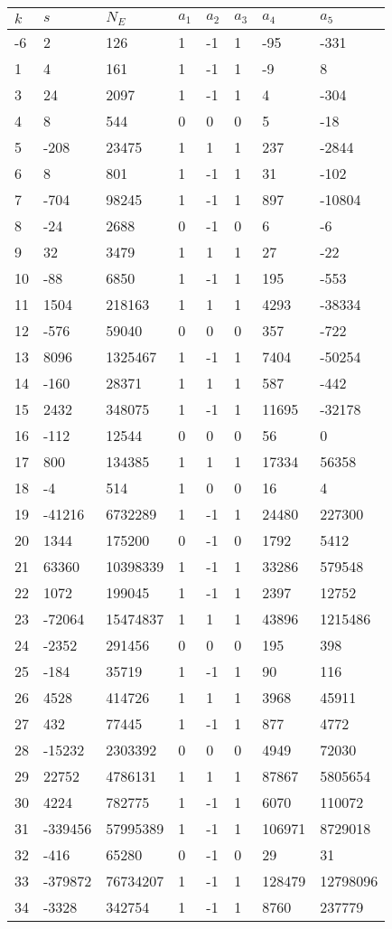 \documentclass{amsart}
\begin{document}
\begin{longtable}{|l|l|l|lllll|}
\hline
$k$ & $s$ & $N_E$ & $a_1$ & $a_2$ & $a_3$ & $a_4$ & $a_5$\\
\hline
-6&2&126&1&-1&1&-95&-331\\
1&4&161&1&-1&1&-9&8\\
3&24&2097&1&-1&1&4&-304\\
4&8&544&0&0&0&5&-18\\
5&-208&23475&1&1&1&237&-2844\\
6&8&801&1&-1&1&31&-102\\
7&-704&98245&1&-1&1&897&-10804\\
8&-24&2688&0&-1&0&6&-6\\
9&32&3479&1&1&1&27&-22\\
10&-88&6850&1&-1&1&195&-553\\
11&1504&218163&1&1&1&4293&-38334\\
12&-576&59040&0&0&0&357&-722\\
13&8096&1325467&1&-1&1&7404&-50254\\
14&-160&28371&1&1&1&587&-442\\
15&2432&348075&1&-1&1&11695&-32178\\
16&-112&12544&0&0&0&56&0\\
17&800&134385&1&1&1&17334&56358\\
18&-4&514&1&0&0&16&4\\
19&-41216&6732289&1&-1&1&24480&227300\\
20&1344&175200&0&-1&0&1792&5412\\
21&63360&10398339&1&-1&1&33286&579548\\
22&1072&199045&1&-1&1&2397&12752\\
23&-72064&15474837&1&1&1&43896&1215486\\
24&-2352&291456&0&0&0&195&398\\
25&-184&35719&1&-1&1&90&116\\
26&4528&414726&1&1&1&3968&45911\\
27&432&77445&1&-1&1&877&4772\\
28&-15232&2303392&0&0&0&4949&72030\\
29&22752&4786131&1&1&1&87867&5805654\\
30&4224&782775&1&-1&1&6070&110072\\
31&-339456&57995389&1&-1&1&106971&8729018\\
32&-416&65280&0&-1&0&29&31\\
33&-379872&76734207&1&-1&1&128479&12798096\\
34&-3328&342754&1&-1&1&8760&237779\\

\end{longtable}
\end{document}
